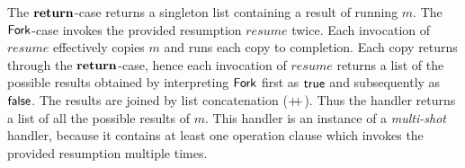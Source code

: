 \documentclass[12pt,phd,lfcs,twoside,openright,logo,leftchapter,normalheadings]{infthesis}
\theoremstyle{plain}
\theoremstyle{definition}
\begin{document}
%
The $\mathbf{return}$-case returns a singleton list containing a result of
running $m$.
%
The $\mathsf{Fork}$-case invokes the provided resumption $resume$ twice. Each
invocation of $resume$ effectively copies $m$ and runs each copy to
completion. Each copy returns through the $\mathbf{return}$-case, hence each
invocation of $resume$ returns a list of the possible results obtained
by interpreting $\mathsf{Fork}$ first as $\mathsf{true}$ and subsequently as
$\mathsf{false}$. The results are joined by list concatenation ($\mathbin{+\!\!+}$).
%
Thus the handler returns a list of all the possible results of $m$.
%
This handler is an instance of a \emph{multi-shot} handler, because it
contains at least one operation clause which invokes the provided
resumption multiple times.
\end{document}
